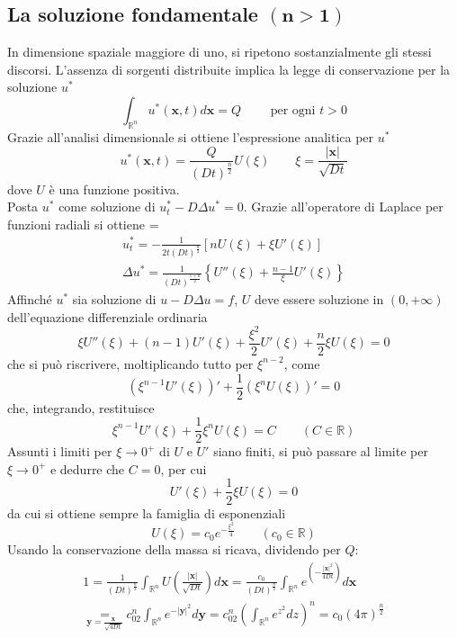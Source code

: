 \documentclass[a4paper,12pt, draft]{article}
\theoremstyle{break}
\numberwithin{equation}{section}
\begin{document}
\subsection{La soluzione fondamentale $\mathbf{(n > 1)}$}
In dimensione spaziale maggiore di uno, si ripetono sostanzialmente gli stessi discorsi. L'assenza di sorgenti distribuite implica la legge di conservazione per la soluzione \(u^*\)
\begin{equation}
\int_{\mathbb{R}^n} u^*(\bm{x}, t)d\bm{x} = Q \qquad \mbox{ per ogni } t > 0
\end{equation}
Grazie all'analisi dimensionale si ottiene l'espressione analitica per \(u^*\)
\[
u^*(\bm{x}, t) = \frac{Q}{(Dt)^{\frac{n}{2}}}U(\xi) \qquad \xi = \frac{|\bm{x}|}{\sqrt{Dt}}  
\]
dove \(U\) è una funzione positiva. \\
Posta \(u^*\) come soluzione di \(u_t^* - D\Delta u^* = 0\). Grazie all'operatore di Laplace per funzioni radiali si ottiene
{\everymath = {\displaystyle}
\[
\begin{array}{c}
  u_t^* = -\frac{1}{2t(Dt)^{\frac{n}{2}}}[nU(\xi) + \xi U'(\xi)] \\
  \Delta u^* = \frac{1}{(Dt)^{\frac{1+n}{2}}} \left\lbrace U''(\xi) + \frac{n-1}{\xi}U'(\xi)\right\rbrace
\end{array}  
\]
}
Affinché \(u^*\) sia soluzione di \(u - D\Delta u = f\), \(U\) deve essere soluzione in \((0, +\infty)\) dell'equazione differenziale ordinaria
\begin{equation}
  \xi U''(\xi) + (n -1)U'(\xi) + \frac{\xi^2}{2}U'(\xi) + \frac{n}{2}\xi U (\xi) = 0
\end{equation}
che si può riscrivere, moltiplicando tutto per \(\xi^{n-2}\), come
\[
(\xi^{n-1}U'(\xi))'+\frac{1}{2}(\xi^n U(\xi))'= 0  
\]
che, integrando, restituisce
\begin{equation}
  \xi^{n-1} U'(\xi) +\frac{1}{2}\xi^n U(\xi) = C \qquad (C\in \mathbb{R})
\end{equation}
Assunti i limiti per \(\xi \to 0^+\) di \(U\) e \(U'\) siano finiti, si può passare al limite per \(\xi \to 0^+\) e dedurre che \(C = 0\), per cui
\[
U'(\xi) + \frac{1}{2}\xi U(\xi) = 0 
\]
da cui si ottiene sempre la famiglia di esponenziali
\[
U(\xi) = c_0e^{-\frac{\xi^2}{4}} \qquad (c_0 \in \mathbb{R})  
\]
Usando la conservazione della massa si ricava, dividendo per \(Q\):
\begin{align*}
  1 = \frac{1}{(Dt)^{\frac{n}{2}}} \int_{\mathbb{R}^n} U \left(\frac{|\bm{x}|}{\sqrt{Dt}}\right)d\bm{x} = \frac{c_0}{(Dt)^\frac{n}{2}} \int_{\mathbb{R}^n}e^{\left(-\frac{|\bm{x}|^2}{4Dt}\right)}d\bm{x} \\
  \underset{\bm{y}=\frac{\bm{x}}{\sqrt{4Dt}}}{=} c_02^n \int_{\mathbb{R}^n} e^{-|\bm{y}|^2}d\bm{y} = c_02^n\left(\int_{\mathbb{R}^n}e^{z^2}dz\right)^n = c_0(4\pi)^{\frac{n}{2}}
\end{align*}
\end{document}
